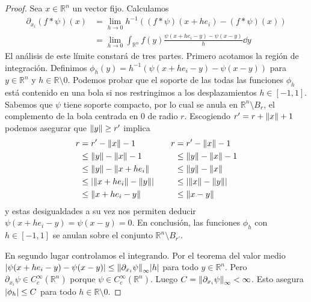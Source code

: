 \documentclass{article}
\newcommand{\realNumbers}{\mathbb{R}}
\theoremstyle{remark}
\begin{document}
\begin{proof}
  Sea \(x \in \realNumbers^n\) un vector fijo.
  Calculamos
  \begin{align}
    \partial_{x_i} (f * \psi)(x)
    &=
    \lim_{h \rightarrow 0} h^{- 1} ((f * \psi)(x + h e_i) - (f * \psi)(x))
    \\
    &=
    \lim_{h \rightarrow 0}
      \int_{\realNumbers^n} f(y)  
      \frac{\psi(x + h e_i - y) - \psi(x - y)}{h}
      \dd y
  \end{align}
  El análisis de este límite constará de tres partes.
  Primero acotamos la región de integración.
  Definimos \(\phi_h(y) = h^{- 1} (\psi(x + h e_i - y) - \psi(x - y))\) para \(y \in \realNumbers^n\) y \(h \in \realNumbers \setminus 0\).
  Podemos probar que el soporte de las todas las funciones \(\phi_h\) está contenido en una bola si nos restringimos a los desplazamientos \(h \in [-1, 1]\).
  Sabemos que \(\psi\) tiene soporte compacto, por lo cual se anula en \(\realNumbers^n \setminus B_r\), el complemento de la bola centrada en 0 de radio \(r\).
  Escogiendo \(r' = r + \norm{x} + 1\) podemos asegurar que \(\norm{y} \geq r'\) implica 
  \begin{align}
    r
    &=
    r' - \norm{x} - 1
      &&& 
      r
      &=
      r' - \norm{x} - 1
    \\
    &\leq
    \norm {y} - \norm{x} - 1 
      &&&
      &\leq
      \norm{y} - \norm{x} - 1
    \\
    &\leq 
    \norm{y} - \norm{x + h e_i} 
      &&&
      &\leq
      \norm{y} - \norm{x}
    \\
    &\leq 
    \abs{\norm{x + h e_i} - \norm{y}} 
      &&&
      &\leq
      \abs{\norm{x} - \norm{y}}
    \\
    &\leq 
    \norm{x + h e_i - y}
      &&&
      &\leq
      \norm{x - y}
  \end{align}
  y estas desigualdades a su vez nos permiten deducir
  \(
    \psi(x + h e_i - y)
    =
    \psi(x - y)
    =
    0
  \).
  En conclusión, las funciones \(\phi_h\) con \(h \in [-1, 1]\) se anulan sobre el conjunto \(\realNumbers^n \setminus B_{r'}\).
  
  En segundo lugar controlamos el integrando.
  Por el teorema del valor medio
  \(
    \abs{\psi(x + h e_i - y) - \psi(x - y)}
    \leq
    \norm{\partial_{x_i} \psi}_{\infty} \abs{h}
  \)
  para todo \(y \in \realNumbers^n\).
  Pero \(\partial_{x_i} \psi \in C^{\infty}_c(\realNumbers^n)\) porque \(\psi \in C^{\infty}_c(\realNumbers^n)\).
  Luego \(C = \norm{\partial_{x_i} \psi}_{\infty} < \infty\).
  Esto asegura \(\abs{\phi_h} \leq C\) para todo \(h \in \realNumbers \setminus 0\).
  

\end{proof}
\end{document}
